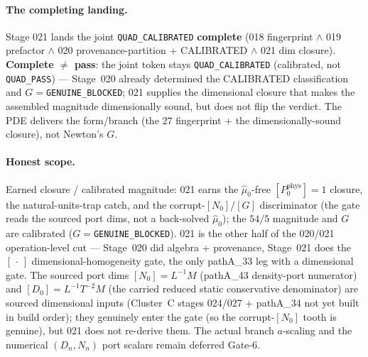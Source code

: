 \paragraph{The completing landing.}
Stage 021 lands the joint \texttt{QUAD\_CALIBRATED} \textbf{complete} (018 fingerprint \(\wedge\) 019 prefactor \(\wedge\)
020 provenance-partition + CALIBRATED \(\wedge\) 021 dim closure). \textbf{Complete \(\neq\) pass}: the joint token stays
\texttt{QUAD\_CALIBRATED} (calibrated, not \texttt{QUAD\_PASS}) --- Stage~020 already determined the CALIBRATED
classification and \(G=\)\texttt{GENUINE\_BLOCKED}; 021 supplies the dimensional closure that makes the assembled magnitude
dimensionally sound, but does not flip the verdict. The PDE delivers the form/branch (the \(27\) fingerprint + the
dimensionally-sound closure), not Newton's \(G\).

\paragraph{Honest scope.}
Earned closure / calibrated magnitude: 021 earns the \(\hat\mu_0\)-free \([P_0^{\mathrm{phys}}]=1\) closure, the
natural-units-trap catch, and the corrupt-\([N_0]\)/\([G]\) discriminator (the gate reads the sourced port dims, not a
back-solved \(\hat\mu_0\)); the \(54/5\) magnitude and \(G\) are calibrated (\(G=\)\texttt{GENUINE\_BLOCKED}). 021 is the other
half of the 020/021 operation-level cut --- Stage~020 did algebra + provenance, Stage~021 does the \([\,\cdot\,]\)
dimensional-homogeneity gate, the only pathA\_33 leg with a dimensional gate. The sourced port dims \([N_0]=L^{-1}M\)
(pathA\_43 density-port numerator) and \([D_0]=L^{-1}T^{-2}M\) (the carried reduced static conservative denominator) are
sourced dimensional inputs (Cluster~C stages 024/027 + pathA\_34 not yet built in build order); they genuinely enter the gate
(so the corrupt-\([N_0]\) tooth is genuine), but 021 does not re-derive them. The actual branch \(a\)-scaling and the
numerical \((D_n,N_n)\) port scalars remain deferred Gate-6.

